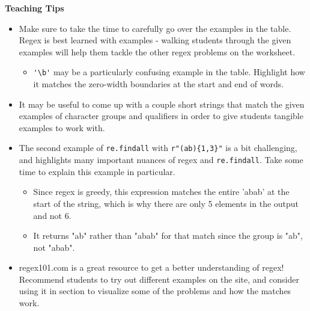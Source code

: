 \begin{guide}
\begin{blocksection}
\textbf{Teaching Tips}
    \begin{itemize}
        \item Make sure to take the time to carefully go over the examples in the table. Regex is best learned with examples - walking students through the given examples will help them tackle the other regex problems on the worksheet.
        \begin{itemize}
            \item \lstinline{'\b'} may be a particularly confusing example in the table. Highlight how it matches the zero-width boundaries at the start and end of words.
        \end{itemize}
        \item It may be useful to come up with a couple short strings that match the given examples of character groups and qualifiers in order to give students tangible examples to work with.
        \item The second example of \lstinline{re.findall} with \lstinline$r"(ab){1,3}"$ is a bit challenging, and highlights many important nuances of regex and \lstinline{re.findall}. Take some time to explain this example in particular.
        \begin{itemize}
            \item Since regex is greedy, this expression matches the entire 'abab' at the start of the string, which is why there are only 5 elements in the output and not 6.
            \item It returns "ab" rather than "abab" for that match since the group is "ab", not "abab". 
        \end{itemize}
        \item regex101.com is a great resource to get a better understanding of regex! Recommend students to try out different examples on the site, and consider using it in section to visualize some of the problems and how the matches work.
    \end{itemize}
\end{blocksection}
\end{guide}
    